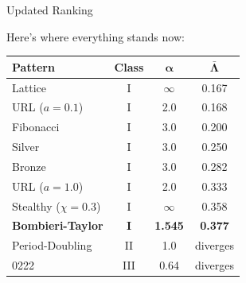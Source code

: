 \documentclass[aspectratio=169, 11pt]{beamer}
\begin{document}
\begin{frame}{Updated Ranking}

Here's where everything stands now:

\vspace{0.3em}
\small
\centering
\begin{tabular}{lccc}
\toprule
\textbf{Pattern} & \textbf{Class} & $\boldsymbol{\alpha}$ & $\boldsymbol{\bar{\Lambda}}$ \\
\midrule
Lattice               & I & $\infty$ & 0.167 \\
URL ($a=0.1$)         & I & 2.0      & 0.168 \\
Fibonacci             & I & 3.0      & 0.200 \\
Silver                & I & 3.0      & 0.250 \\
Bronze                & I & 3.0      & 0.282 \\
URL ($a=1.0$)         & I & 2.0      & 0.333 \\
Stealthy ($\chi=0.3$) & I & $\infty$ & 0.358 \\
\rowcolor{resultbg}
\textbf{Bombieri-Taylor} & \textbf{I} & \textbf{1.545} & \textbf{0.377} \\
\midrule
Period-Doubling       & II  & 1.0  & diverges \\
0222                  & III & 0.64 & diverges \\
\bottomrule
\end{tabular}
\end{frame}
\end{document}
